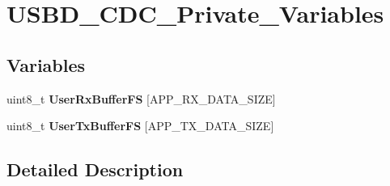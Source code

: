 \hypertarget{group___u_s_b_d___c_d_c___private___variables}{}\section{U\+S\+B\+D\+\_\+\+C\+D\+C\+\_\+\+Private\+\_\+\+Variables}
\label{group___u_s_b_d___c_d_c___private___variables}
\subsection*{Variables}
\begin{DoxyCompactItemize}
\item 
\hypertarget{group___u_s_b_d___c_d_c___private___variables_ga1e37e6616e6affe5acf9c0befd063f6a}{}\label{group___u_s_b_d___c_d_c___private___variables_ga1e37e6616e6affe5acf9c0befd063f6a} 
uint8\+\_\+t {\bfseries User\+Rx\+Buffer\+FS} \mbox{[}A\+P\+P\+\_\+\+R\+X\+\_\+\+D\+A\+T\+A\+\_\+\+S\+I\+ZE\mbox{]}
\item 
\hypertarget{group___u_s_b_d___c_d_c___private___variables_gad48fea85cdb7aed49bf62140a52f23e0}{}\label{group___u_s_b_d___c_d_c___private___variables_gad48fea85cdb7aed49bf62140a52f23e0} 
uint8\+\_\+t {\bfseries User\+Tx\+Buffer\+FS} \mbox{[}A\+P\+P\+\_\+\+T\+X\+\_\+\+D\+A\+T\+A\+\_\+\+S\+I\+ZE\mbox{]}
\end{DoxyCompactItemize}


\subsection{Detailed Description}
